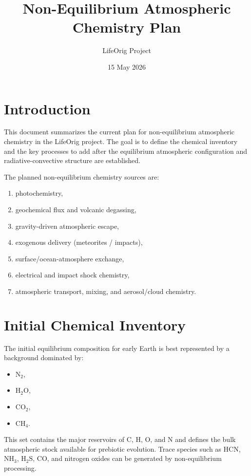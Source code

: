 \documentclass[11pt]{article}
\title{Non-Equilibrium Atmospheric Chemistry Plan}
\author{LifeOrig Project}
\date{15 May 2026}
\begin{document}
\maketitle

\section{Introduction}

This document summarizes the current plan for non-equilibrium atmospheric chemistry in the LifeOrig project. The goal is to define the chemical inventory and the key processes to add after the equilibrium atmospheric configuration and radiative-convective structure are established.

The planned non-equilibrium chemistry sources are:
\begin{enumerate}
  \item photochemistry,
  \item geochemical flux and volcanic degassing,
  \item gravity-driven atmospheric escape,
  \item exogenous delivery (meteorites / impacts),
  \item surface/ocean-atmosphere exchange,
  \item electrical and impact shock chemistry,
  \item atmospheric transport, mixing, and aerosol/cloud chemistry.
\end{enumerate}

\section{Initial Chemical Inventory}

The initial equilibrium composition for early Earth is best represented by a background dominated by:
\begin{itemize}
  \item $\mathrm{N_2}$,
  \item $\mathrm{H_2O}$,
  \item $\mathrm{CO_2}$,
  \item $\mathrm{CH_4}$.
\end{itemize}

This set contains the major reservoirs of C, H, O, and N and defines the bulk atmospheric stock available for prebiotic evolution. Trace species such as $\mathrm{HCN}$, $\mathrm{NH_3}$, $\mathrm{H_2S}$, $\mathrm{CO}$, and nitrogen oxides can be generated by non-equilibrium processing.
\end{document}
